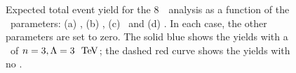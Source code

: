 \begin{figure}[htbp]
\begin{center}
\caption{
\small
Expected total event yield for the 8~\tev\ analysis as a function of the \TGC\ parameters: (a) \ffourg, (b) \ffourZ,
(c) \ffiveg\ and (d) \ffiveZ. In each case, the other parameters are set to
zero. The solid blue shows the yields with a \formfactor\ of $n=3,
\Lambda=3~\tev$; the dashed red curve shows the yields with no \formfactor.
 }
\label{fig:TGC-yield-curves}
\end{center}
\end{figure}


